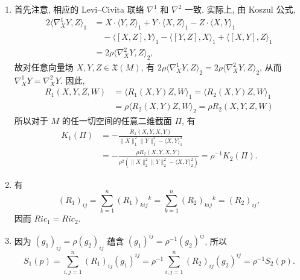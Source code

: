 \begin{description}[font=\normalfont,leftmargin=2em,labelwidth=1.5em]
\begin{enumerate}[label=(\alph*),ref=\alph*,leftmargin=*]
\item 首先注意, 相应的 Levi–Civita 联络 $\nabla^1$ 和 $\nabla^2$ 一致. 实际上, 由 Koszul 公式,
\begin{align*}
  2\langle\nabla_X^1Y,Z\rangle_1
  &=X\cdot\langle Y,Z\rangle_1+Y\cdot\langle X,Z\rangle_1-Z\cdot\langle X,Y\rangle_1\\
  &\quad-\langle[X,Z],Y\rangle_1-\langle[Y,Z],X\rangle_1+\langle[X,Y],Z\rangle_1\\
  &=2\rho\langle\nabla_X^2Y,Z\rangle_2,
\end{align*}
故对任意向量场 $X,Y,Z\in\mathfrak X(M)$, 有 $2\rho\langle\nabla_X^1Y,Z\rangle_2=2\rho\langle\nabla_X^2Y,Z\rangle_2$, 从而 $\nabla_X^1Y=\nabla_X^2Y$. 因此,
\begin{align*}
  R_1(X,Y,Z,W)
  &=\langle R_1(X,Y)Z,W\rangle_1=\langle R_2(X,Y)Z,W\rangle_1\\
  &=\rho\langle R_2(X,Y)Z,W\rangle_2=\rho R_2(X,Y,Z,W)
\end{align*}
所以对于 $M$ 的任一切空间的任意二维截面 $\Pi$, 有
\begin{align*}
  K_1(\Pi)&=-\frac{R_1(X,Y,X,Y)}{\lVert X\rVert_1^2\lVert Y\rVert_1^2-\langle X,Y\rangle_1^2}\\
  &=-\frac{\rho R_2(X,Y,X,Y)}
              {\rho^2(\lVert X\rVert_2^2\lVert Y\rVert_2^2-\langle X,Y\rangle_2^2)}
  =\rho^{-1}K_2(\Pi).
\end{align*}
\item 有
\[
  (R_1)_{ij}=\sum_{k=1}^n(R_1)_{kij}{}^k=\sum_{k=1}^n(R_2)_{kij}{}^k=(R_2)_{ij},
\]
因而 $\mathit{Ric}_1=\mathit{Ric}_2$.
\item 因为 $(g_1)_{ij}=\rho(g_2)_{ij}$ 蕴含 $(g_1)^{ij}=\rho^{-1}(g_2)^{ij}$, 所以
\[
  S_1(p)=\sum_{i,j=1}^n(R_1)_{ij}(g_1)^{ij}
  =\rho^{-1}\sum_{i,j=1}^n(R_2)_{ij}(g_2)^{ij}=\rho^{-1}S_2(p).
\]
\end{enumerate}
\end{description}
